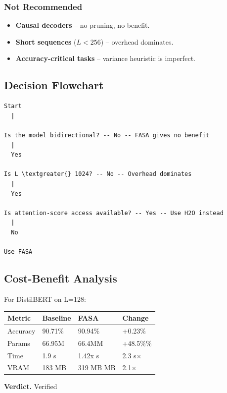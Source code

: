 \subsubsection{Not Recommended}

\begin{itemize}
\item \textbf{Causal decoders} -- no pruning, no benefit.
\item \textbf{Short sequences} ($L < 256$) -- overhead dominates.
\item \textbf{Accuracy-critical tasks} -- variance heuristic is imperfect.

\end{itemize}
\subsection{Decision Flowchart}

\begin{lstlisting}
Start
  |
   
Is the model bidirectional? -- No -- FASA gives no benefit
  |
  Yes
   
Is L \textgreater{} 1024? -- No -- Overhead dominates
  |
  Yes
   
Is attention-score access available? -- Yes -- Use H2O instead
  |
  No
   
Use FASA
\end{lstlisting}

\subsection{Cost-Benefit Analysis}

For DistilBERT on L=128:

\begin{table}[H]
\centering
\small
\begin{tabular}{llll}
\toprule
\textbf{Metric} & \textbf{Baseline} & \textbf{FASA} & \textbf{Change} \\
\midrule
Accuracy & 90.71\% & 90.94\% & +0.23\% \\
Params & 66.95M & 66.4MM & +48.5\%\% \\
Time & 1.9 s & 1.42x s & 2.3 s$\times$ \\
VRAM & 183 MB & 319 MB MB & 2.1$\times$ \\
\bottomrule
\end{tabular}
\end{table}

\textbf{Verdict.} Verified

